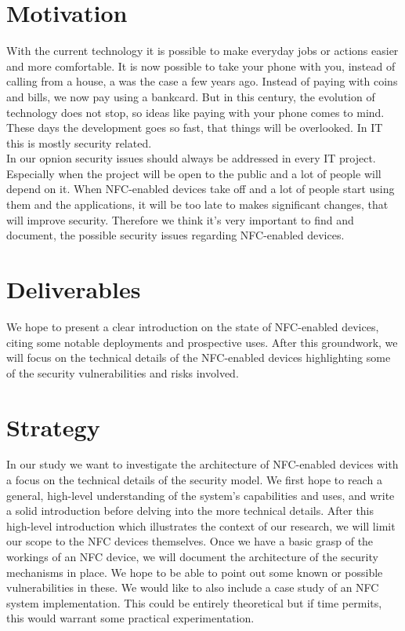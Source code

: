 \documentclass[11pt]{article} %
\begin{document}
\section{Motivation}

With the current technology it is possible to make everyday jobs or actions easier and more comfortable. It is now possible to take your phone with you, instead of calling from a house, a was the case a few years ago. Instead of paying with coins and bills, we now pay using a bankcard. But in this century, the evolution of technology does not stop, so ideas like paying with your phone comes to mind. These days the development goes so fast, that things will be overlooked. In IT this is mostly security related. 
\\

\noindent In our opnion security issues should always be addressed in every IT project. Especially when the project will be open to the public and a lot of people will depend on it. When NFC-enabled devices take off and a lot of people start using them and the applications, it will be too late to makes significant changes, that will improve security. Therefore we think it's very important to find and document, the possible security issues regarding NFC-enabled devices.

\section{Deliverables}
We hope to present a clear introduction on the state of NFC-enabled devices, citing some notable deployments and prospective uses.
After this groundwork, we will focus on the technical details of the NFC-enabled devices highlighting some of the security vulnerabilities and risks involved.

\section{Strategy}
In our study we want to investigate the architecture of NFC-enabled devices with a focus on the technical details of the security model. We first hope to reach a general, high-level understanding of the system's capabilities and uses, and write a solid introduction before delving into the more technical details. After this high-level introduction which illustrates the context of our research, we will limit our scope to the NFC devices themselves.
Once we have a basic grasp of the workings of an NFC device, we will document the architecture of the security mechanisms in place. We hope to be able to point out some known or possible vulnerabilities in these.
We would like to also include a case study of an NFC system implementation. This could be entirely theoretical but if time permits, this would warrant some practical experimentation.
\end{document}
